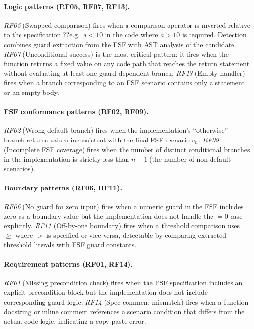 \paragraph{Logic patterns (RF05, RF07, RF13).}
\emph{RF05} (Swapped comparison) fires when a comparison operator is inverted
relative to the specification ??e.g.\ $a < 10$ in the code where $a > 10$
is required.  Detection combines guard extraction from the FSF with AST
analysis of the candidate.
\emph{RF07} (Unconditional success) is the most critical pattern: it fires
when the function returns a fixed value on any code path that reaches the
return statement without evaluating at least one guard-dependent branch.
\emph{RF13} (Empty handler) fires when a branch corresponding to an FSF
scenario contains only a  statement or an empty body.

\paragraph{FSF conformance patterns (RF02, RF09).}
\emph{RF02} (Wrong default branch) fires when the implementation's
``otherwise'' branch returns values inconsistent with the final FSF scenario
$s_n$.  \emph{RF09} (Incomplete FSF coverage) fires when the number of
distinct conditional branches in the implementation is strictly less than $n-1$
(the number of non-default scenarios).

\paragraph{Boundary patterns (RF06, RF11).}
\emph{RF06} (No guard for zero input) fires when a numeric guard in the FSF
includes zero as a boundary value but the implementation does not handle the
$= 0$ case explicitly.  \emph{RF11} (Off-by-one boundary) fires when
a threshold comparison uses $\ge$ where $>$ is specified or vice versa,
detectable by comparing extracted threshold literals with FSF guard constants.

\paragraph{Requirement patterns (RF01, RF14).}
\emph{RF01} (Missing precondition check) fires when the FSF specification
includes an explicit precondition block but the implementation does not include
corresponding guard logic.  \emph{RF14} (Spec-comment mismatch) fires when
a function docstring or inline comment references a scenario condition that
differs from the actual code logic, indicating a copy-paste error.

